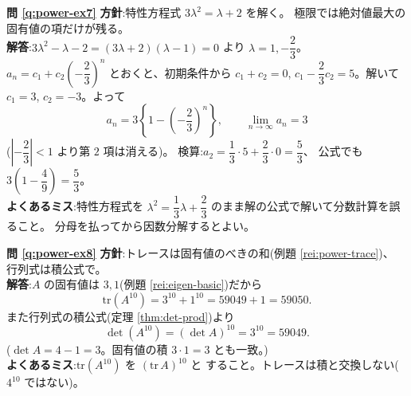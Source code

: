 \bigskip
\noindent\textbf{問 \ref{q:power-ex7}}\quad
\textbf{方針}:特性方程式 $3\lambda^2 = \lambda + 2$ を解く。
極限では絶対値最大の固有値の項だけが残る。\\
\textbf{解答}:$3\lambda^2 - \lambda - 2 = (3\lambda + 2)(\lambda - 1) = 0$
より $\lambda = 1, -\dfrac{2}{3}$。
$a_n = c_1 + c_2\left(-\dfrac{2}{3}\right)^n$ とおくと、初期条件から
$c_1 + c_2 = 0$, $c_1 - \dfrac{2}{3}c_2 = 5$。解いて
$c_1 = 3$, $c_2 = -3$。よって
\[
a_n = 3\left\{1 - \left(-\frac{2}{3}\right)^n\right\}, \qquad
\lim_{n\to\infty} a_n = 3
\]
($\left|-\dfrac{2}{3}\right| < 1$ より第 $2$ 項は消える)。
検算:$a_2 = \dfrac{1}{3} \cdot 5 + \dfrac{2}{3} \cdot 0 = \dfrac{5}{3}$、
公式でも $3\left(1 - \dfrac{4}{9}\right) = \dfrac{5}{3}$。\\
\textbf{よくあるミス}:特性方程式を $\lambda^2 = \dfrac{1}{3}\lambda +
\dfrac{2}{3}$ のまま解の公式で解いて分数計算を誤ること。
分母を払ってから因数分解するとよい。

\bigskip
\noindent\textbf{問 \ref{q:power-ex8}}\quad
\textbf{方針}:トレースは固有値のべきの和(例題 \ref{rei:power-trace})、
行列式は積公式で。\\
\textbf{解答}:$A$ の固有値は $3, 1$(例題 \ref{rei:eigen-basic})だから
\[
\mathrm{tr}(A^{10}) = 3^{10} + 1^{10} = 59049 + 1 = 59050.
\]
また行列式の積公式(定理 \ref{thm:det-prod})より
\[
\det(A^{10}) = (\det A)^{10} = 3^{10} = 59049.
\]
($\det A = 4 - 1 = 3$。固有値の積 $3 \cdot 1 = 3$ とも一致。)\\
\textbf{よくあるミス}:$\mathrm{tr}(A^{10})$ を $(\mathrm{tr}\,A)^{10}$ と
すること。トレースは積と交換しない($4^{10}$ ではない)。

